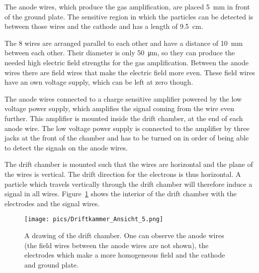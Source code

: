 \documentclass[12pt]{article}
\begin{document}
The anode wires, which produce the gas amplification, are placed \SI{5}{\milli\meter} in front of the ground plate. The sensitive region in which the particles can be detected is between those wires and the cathode and has a length of \SI{9.5}{\centi\meter}.

The 8 wires are arranged parallel to each other and  have a distance of \SI{10}{\milli\meter} between each other. Their diameter is only \SI{50}{\micro\meter}, so they can produce the needed high electric field strengths for the gas amplification. Between the anode wires there are field wires that make the electric field more even. These field wires have an own voltage supply, which can be left at zero though. 

The anode wires connected to a charge sensitive amplifier powered by the low voltage power supply, which amplifies the signal coming from the wire even further. This amplifier is mounted inside the drift chamber, at the end of each anode wire. The low voltage power supply is connected to the amplifier by three jacks at the front of the chamber and has to be turned on in order of being able to detect the signals on the anode wires. 

The drift chamber is mounted such that the wires are horizontal and the plane of the wires is vertical. The drift direction for the electrons is thus horizontal. A particle which travels vertically through the drift chamber will therefore induce a signal in all wires. Figure~\ref{fig:CAD} shows the interior of the drift chamber with the electrodes and the signal wires. 

\begin{figure}[h]
\texttt{[image: pics/Driftkammer\_Ansicht\_5.png]}
\centering
\caption{A drawing of the drift chamber. One can observe the anode wires (the field wires between the anode wires are not shown), the electrodes which make a more homogeneous field and the cathode and ground plate.}
\label{fig:CAD}
\end{figure}


\end{document}
